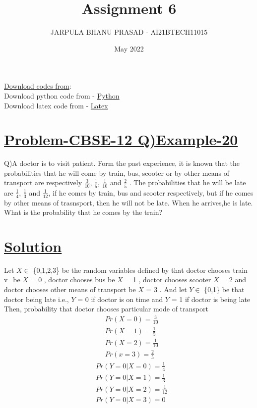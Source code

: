 \documentclass[journal,12pt,twocolumn]{IEEEtran}
\title{Assignment 6}
\author{JARPULA BHANU PRASAD - AI21BTECH11015}
\date{May 2022}
\begin{document}
\maketitle
\noindent \Large\underline{Download codes from}:\\
\noindent\large Download python code from - \href{https://github.com/jarpula-Bhanu/Assignment-6/blob/main/code/verify.py}{Python}\\ Download latex code from - \href{https://github.com/jarpula-Bhanu/Assignment-6/blob/main/Assignment\%206.tex}{Latex}

\section{\large\underline{Problem-CBSE-12 Q)Example-20}}
\noindent\large Q)A doctor is to visit patient. Form the past experience, it is known that the probabilities that he will come by train, bus, scooter or by other means of transport are respectively $\frac{3}{10}$, $\frac{1}{5}$, $\frac{1}{10}$ and $\frac{2}{5}$ . The probabilities that he will be late are $\frac{1}{4}$, $\frac{1}{3}$ and $\frac{1}{12}$, if he comes by train, bus and scooter respectively, but if he comes by other means of trasnsport, then he will not be late. When he arrives,he is late. What is the probability that he comes by the train?

\section{\large\underline{Solution}}
Let $X \in$ \{0,1,2,3\} be the random variables defined by that doctor chooses train v=be $X$ = 0 , doctor chooses bus be $X$ = 1 , doctor chooses scooter $X$ = 2 and doctor chooses other means of transport be $X$ = 3 . And let $Y \in$ \{0,1\} be that doctor being late i.e., $Y$ = 0 if doctor is on time and $Y$ = 1 if doctor is being late\\
Then, probability that doctor chooses particular mode of transport
\begin{align}
& Pr(X=0) = \frac{3}{10} \\
& Pr(X=1) = \frac{1}{5} \\
& Pr(X=2) = \frac{1}{10} \\
& Pr(x=3) = \frac{2}{5} 
\end{align}
\begin{align}
& Pr(Y = 0|X = 0) = \frac{1}{4} \\
& Pr(Y = 0|X = 1) = \frac{1}{3} \\
& Pr(Y = 0|X = 2) = \frac{1}{12}\\
& Pr(Y = 0|X = 3) = 0
\end{align}
\end{document}
